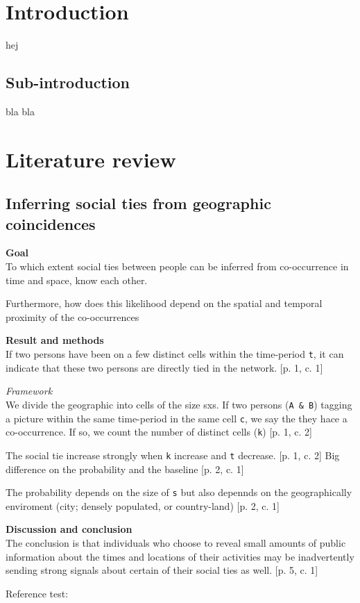\section{Introduction}
hej

\subsection{Sub-introduction}
bla bla


\section{Literature review}
\subsection{Inferring social ties from geographic coincidences \cite{ISTfGC}}
\textbf{Goal}\\
To which extent social ties between people can be inferred from co-occurrence in time and space, know each other. 

Furthermore, how does this likelihood depend on the spatial and temporal proximity of the co-occurrences



\textbf{Result and methods}\\
If two persons have been on a few distinct cells within the time-period \texttt{t}, it can indicate that these two persons are directly tied in the network. [p. 1, c. 1]

\textit{Framework}\\
We divide the geographic into cells of the size sxs. 
If two persons (\texttt{A \& B}) tagging a picture within the same time-period in the same cell \texttt{c}, we say the they hace a co-occurrence. If so, we count the number of distinct cells (\texttt{k}) [p. 1, c. 2]


The social tie increase strongly when \texttt{k} increase and \texttt{t} decrease. [p. 1, c. 2]
Big difference on the probability and the baseline [p. 2, c. 1]

The probability depends on the size of \texttt{s} but also depennds on the geographically enviroment (city; densely populated, or country-land) [p. 2, c. 1]


\textbf{Discussion and conclusion}\\
The conclusion is that individuals who choose to reveal small amounts of public information about the times and locations of their activities may be inadvertently sending strong signals about certain of their social ties as well. [p. 5, c. 1]

Reference test: \cite{mrx05}